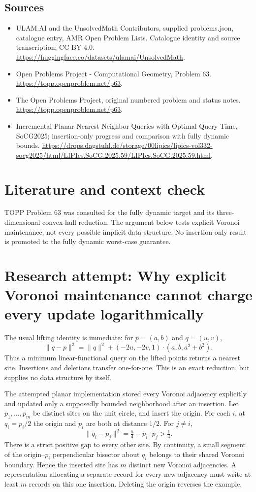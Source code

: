 \documentclass[11pt,a4paper]{article}
\begin{document}
\subsection{Sources}
\begin{itemize}
\item[S1] ULAM.AI and the UnsolvedMath Contributors, supplied problems.json, catalogue entry, AMR Open Problem Lists. Catalogue identity and source transcription; CC BY 4.0.
\url{https://huggingface.co/datasets/ulamai/UnsolvedMath}.
\item[S2] Open Problems Project - Computational Geometry, Problem 63. 
\url{https://topp.openproblem.net/p63}.
\item[S3] The Open Problems Project, original numbered problem and status notes.
\url{https://topp.openproblem.net/p63}.
\item[S4] Incremental Planar Nearest Neighbor Queries with Optimal Query Time, SoCG2025; insertion-only progress and comparison with fully dynamic bounds.
\url{https://drops.dagstuhl.de/storage/00lipics/lipics-vol332-socg2025/html/LIPIcs.SoCG.2025.59/LIPIcs.SoCG.2025.59.html}.
\end{itemize}

\section{Literature and context check}
TOPP Problem 63 was consulted for the fully dynamic target and its
three-dimensional convex-hull reduction. The argument below tests explicit
Voronoi maintenance, not every possible implicit data structure. No insertion-only
result is promoted to the fully dynamic worst-case guarantee.
\section{Research attempt: Why explicit Voronoi maintenance cannot charge every update logarithmically}
The usual lifting identity is immediate: for $p=(a,b)$ and $q=(u,v)$,
\[
 \|q-p\|^2=\|q\|^2+(-2u,-2v,1)\cdot(a,b,a^2+b^2).
\]
Thus a minimum linear-functional query on the lifted points returns a nearest
site. Insertions and deletions transfer one-for-one. This is an exact reduction,
but supplies no data structure by itself.

The attempted planar implementation stored every Voronoi adjacency explicitly
and updated only a supposedly bounded neighborhood after an insertion. Let
$p_1,\ldots,p_m$ be distinct sites on the unit circle, and insert the origin.
For each $i$, at $q_i=p_i/2$ the origin and $p_i$ are both at distance $1/2$.
For $j\ne i$,
\[
 \|q_i-p_j\|^2=\tfrac54-p_i\cdot p_j>\tfrac14.
\]
There is a strict positive gap to every other site. By continuity, a small
segment of the origin--$p_i$ perpendicular bisector about $q_i$ belongs to
their shared Voronoi boundary. Hence the inserted site has $m$ distinct new
Voronoi adjacencies. A representation allocating a separate record for every
new adjacency must write at least $m$ records on this one insertion. Deleting
the origin reverses the example.
\end{document}

